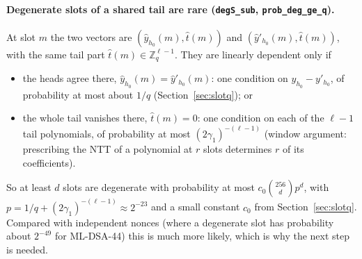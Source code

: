\documentclass[11pt]{article}
\theoremstyle{definition}
\theoremstyle{remark}
\newcommand{\Z}{\mathbb{Z}}
\newcommand{\lean}[1]{\texttt{#1}}
\begin{document}
\paragraph{Degenerate slots of a shared tail are rare (\lean{degS\_sub}, \lean{prob\_deg\_ge\_q}).}
At slot $m$ the two vectors are $(\hat y_{h_0}(m), \hat t(m))$ and
$(\hat y'_{h_0}(m), \hat t(m))$, with the same tail part $\hat t(m)\in\Z_q^{\ell-1}$. They are
linearly dependent only if
\begin{itemize}
\item the heads agree there, $\hat y_{h_0}(m) = \hat y'_{h_0}(m)$: one condition on
  $y_{h_0}-y'_{h_0}$, of probability at most about $1/q$ (Section~\ref{sec:slotq}); or
\item the whole tail vanishes there, $\hat t(m) = 0$: one condition on each of the $\ell-1$ tail
  polynomials, of probability at most $(2\gamma_1)^{-(\ell-1)}$ (window argument: prescribing
  the NTT of a polynomial at $r$ slots determines $r$ of its coefficients).
\end{itemize}
So at least $d$ slots are degenerate with probability at most $c_0\binom{256}{d}p^d$, with
$p = 1/q + (2\gamma_1)^{-(\ell-1)}\approx2^{-23}$ and a small constant $c_0$ from
Section~\ref{sec:slotq}. Compared with independent nonces (where a degenerate slot has probability
about $2^{-49}$ for ML-DSA-44) this is much more likely, which is why the next step is needed.
\end{document}
